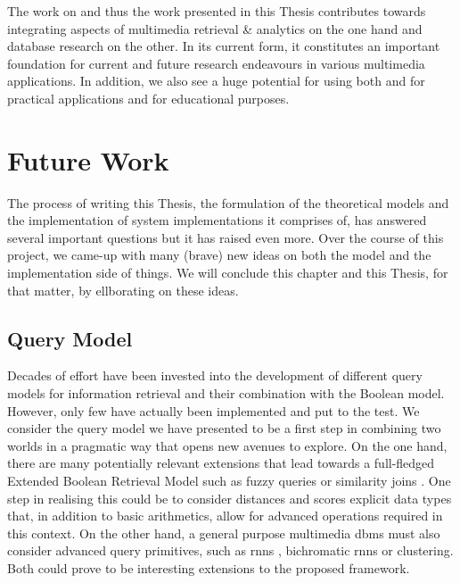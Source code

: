The work on \cottontail{} and thus the work presented in this Thesis contributes towards integrating aspects of multimedia retrieval \& analytics on the one hand and database research on the other. In its current form, it constitutes an important foundation for current and future research endeavours in various multimedia applications. In addition, we also see a huge potential for using both \vitrivr{} and \cottontail{} for practical applications and for educational purposes.

\section{Future Work}

The process of writing this Thesis, the formulation of the theoretical models and the implementation of system implementations it comprises of, has answered several important questions but it has raised even more. Over the course of this project, we came-up with many (brave) new ideas on both the model and the implementation side of things. We will conclude this chapter and this Thesis, for that matter, by ellborating on these ideas.

\subsection{Query Model}

Decades of effort have been invested into the development of different query models for information retrieval and their combination with the Boolean model. However, only few have actually been implemented and put to the test. We consider the query model we have presented to be a first step in combining two worlds in a pragmatic way that opens new avenues to explore. On the one hand, there are many potentially relevant extensions that lead towards a full-fledged Extended Boolean Retrieval Model \cite{Salton:1983Extended} such as fuzzy queries \cite{Umano:1983Retrieval,Bohm:2001Fast} or similarity joins \cite{Yao:2010K}. One step in realising this could be to consider distances and scores explicit data types that, in addition to basic arithmetics, allow for advanced operations required in this context. On the other hand, a general purpose multimedia \acrshort{dbms} must also consider advanced query primitives, such as \acrshort{rnns} \cite{Korn:2000Influence}, bichromatic \acrshort{rnns} \cite{Stanoi:2001Discovery} or clustering. Both could prove to be interesting extensions to the proposed framework.

